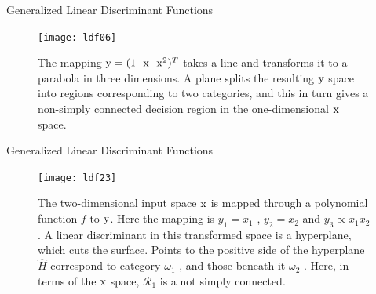 \begin{frame}{Generalized Linear Discriminant Functions}
\begin{figure}
\texttt{[image: ldf06]}
\caption{The mapping ${\rm y} = (1~~ {\rm x}~~ {\rm x}^2 )^T$ takes a line and transforms it to a parabola
in three dimensions. A plane splits the resulting ${\rm y}$ space into regions corresponding
to two categories, and this in turn gives a non-simply connected decision region in the
one-dimensional ${\rm x}$ space.}
\end{figure}
\end{frame}

\begin{frame}{Generalized Linear Discriminant Functions}
\begin{figure}
\texttt{[image: ldf23]}
\caption{The two-dimensional input space ${\rm x}$ is mapped through a polynomial
function $f$ to ${\rm y}$. Here the mapping is ${ y}_1 = {x}_1$ , ${y}_2 = {x}_2$ and ${y}_3\propto {x}_1 {x}_2$ . A linear
discriminant in this transformed space is a hyperplane, which cuts the surface. Points to the positive side of the hyperplane $\hat{H}$ correspond to category $\omega_1$ , and those beneath
it $\omega_2$ . Here, in terms of the ${\rm x}$ space, $\mathcal{R}_1$ is a not simply connected.}
\end{figure}
\end{frame}

%
%
%

